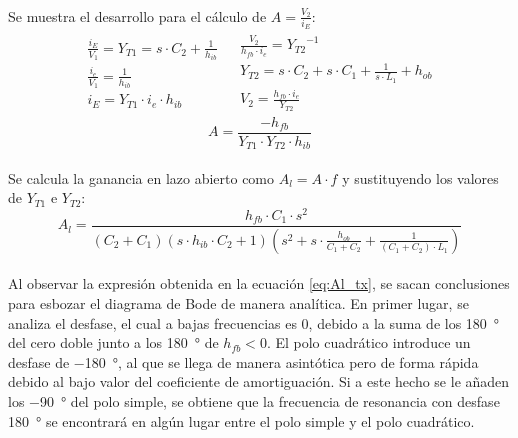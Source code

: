 \paragraph{}
Se muestra el desarrollo para el c\'alculo de $A = \frac{V_2}{i_E}$:
\[
\begin{array}{rl} 
      \begin{array}{l}
   \frac{i_E}{V_1} = Y_{T1} = s\cdot C_2 + \frac{1}{h_{ib}} \\
   \frac{i_e}{V_{1}} = \frac{1}{h_{ib}} \\
   i_E = Y_{T1} \cdot i_e \cdot h_{ib}
      \end{array}
      &
      \begin{array}{r}
   \frac{V_2}{h_{fb}\cdot i_e} = {Y_{T2}}^{-1} \\
   Y_{T2} = s\cdot C_2 + s\cdot C_1 + \frac{1}{s\cdot L_1} + h_{ob} \\
   V_2 = \frac{h_{fb}\cdot i_e}{Y_{T2}} 
      \end{array}
\end{array}
\]
\begin{equation}
   A = \frac{-h_{fb}}{Y_{T1} \cdot Y_{T2} \cdot h_{ib}} 
\end{equation}
\paragraph{}
Se calcula la ganancia en lazo abierto como $A_l = A \cdot f$ y sustituyendo los valores de $Y_{T1}$ e $Y_{T2}$:
\begin{equation}
   \label{eq:Al_tx}
   A_l = \frac{h_{fb} \cdot C_1 \cdot s^2}{ \left( C_2+C_1 \right) \left( s \cdot h_{ib} \cdot C_2 + 1\right) \left( s^2 + s \cdot \frac{h_{ob}}{C_1 + C_2} + \frac{1}{(C_1 + C_2)\cdot L_1}\right) }
\end{equation}
\paragraph{}
Al observar la expresi\'on obtenida en la ecuaci\'on \ref{eq:Al_tx}, se sacan conclusiones para esbozar el diagrama de Bode de manera anal\'itica. En primer lugar, se analiza el desfase, el cual a bajas frecuencias es 0, debido a la suma de los \SI{180}{\degree} del cero doble junto a los \SI{180}{\degree} de $h_{fb} < 0$. El polo cuadr\'atico introduce un desfase de \SI{-180}{\degree}, al que se llega de manera asint\'otica pero de forma r\'apida debido al bajo valor del coeficiente de amortiguaci\'on. Si a este hecho se le añaden los \SI{-90}{\degree} del polo simple, se obtiene que la frecuencia de resonancia con desfase \SI{180}{\degree} se encontrará en algún lugar entre el polo simple y el polo cuadrático.
